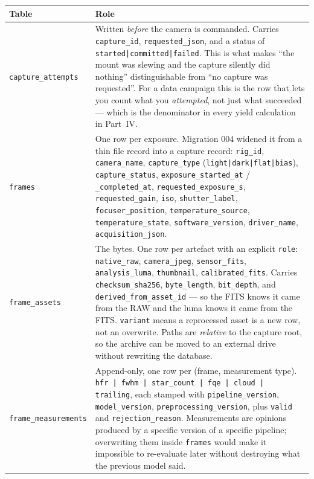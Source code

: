 \documentclass[11pt]{article}
\newcommand{\co}[1]{\texttt{\small #1}}
\begin{document}
\begin{center}
\small
\begin{tabular}{@{}lp{}@{}}
\toprule
\textbf{Table} & \textbf{Role} \\
\midrule
\co{capture\_attempts} & Written \emph{before} the camera is commanded. Carries
\co{capture\_id}, \co{requested\_json}, and a status of
\co{started|committed|failed}. This is what makes ``the mount was slewing and
the capture silently did nothing'' distinguishable from ``no capture was
requested''. For a data campaign this is the row that lets you count what you
\emph{attempted}, not just what succeeded --- which is the denominator in every
yield calculation in Part~IV. \\
\addlinespace
\co{frames} & One row per exposure. Migration 004 widened it from a thin file
record into a capture record: \co{rig\_id}, \co{camera\_name},
\co{capture\_type} (\co{light|dark|flat|bias}), \co{capture\_status},
\co{exposure\_started\_at} / \co{\_completed\_at}, \co{requested\_exposure\_s},
\co{requested\_gain}, \co{iso}, \co{shutter\_label}, \co{focuser\_position},
\co{temperature\_source}, \co{temperature\_state}, \co{software\_version},
\co{driver\_name}, \co{acquisition\_json}. \\
\addlinespace
\co{frame\_assets} & The bytes. One row per artefact with an explicit
\co{role}: \co{native\_raw}, \co{camera\_jpeg}, \co{sensor\_fits},
\co{analysis\_luma}, \co{thumbnail}, \co{calibrated\_fits}. Carries
\co{checksum\_sha256}, \co{byte\_length}, \co{bit\_depth}, and
\co{derived\_from\_asset\_id} --- so the FITS knows it came from the RAW and the
luma knows it came from the FITS. \co{variant} means a reprocessed asset is a
new row, not an overwrite. Paths are \emph{relative} to the capture root, so the
archive can be moved to an external drive without rewriting the database. \\
\addlinespace
\co{frame\_measurements} & Append-only, one row per (frame, measurement type).
\co{hfr | fwhm | star\_count | fqe | cloud | trailing}, each stamped with
\co{pipeline\_version}, \co{model\_version}, \co{preprocessing\_version}, plus
\co{valid} and \co{rejection\_reason}. Measurements are opinions produced by a
specific version of a specific pipeline; overwriting them inside \co{frames}
would make it impossible to re-evaluate later without destroying what the
previous model said. \\
\bottomrule
\end{tabular}
\end{center}
\end{document}
